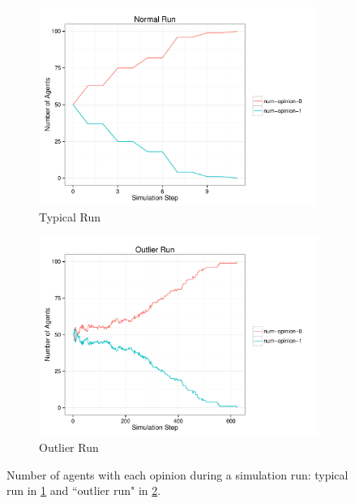 \documentclass[preprint,number]{elsarticle}
\begin{document}
\begin{figure}[H]
	\centering
	\begin{subfigure}{.49\linewidth}
		\centering
		\includegraphics[width=1\linewidth]{"../analysis/pdf/context_permeability_simrun_kregular_k10_normal"}
		\caption{Typical Run}
		\label{fig:ctx_perm_kreg_run_normal}
	\end{subfigure}%
	\begin{subfigure}{.49\linewidth}
		\centering
		\includegraphics[width=1\linewidth]{"../analysis/pdf/context_permeability_simrun_kregular_k10_outlier"}
		\caption{Outlier Run}
		\label{fig:ctx_perm_kreg_run_outlier}
	\end{subfigure}
	
	\begin{minipage}{0.9\linewidth}
		\vspace{0.2cm}
		\caption{Number of agents with each opinion during a simulation run: typical run in \ref{fig:ctx_perm_kreg_run_normal} and ``outlier run" in \ref{fig:ctx_perm_kreg_run_outlier}.}
		\label{fig:ctx_perm_kreg_runs}
	\end{minipage}
\end{figure}
\end{document}
